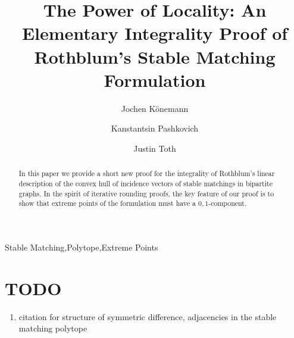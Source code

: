\documentclass[3p,times]{elsarticle}
\begin{document}
\begin{frontmatter}



\title{The Power of Locality: An Elementary Integrality
  Proof of Rothblum's Stable Matching Formulation}
\author[co]{Jochen K\"{o}nemann}
\author[co]{Kanstantsin Pashkovich}
\author[co]{Justin Toth}
\address[co]{Department of Combinatorics and Optimization, University of Waterloo, Canada}


\begin{abstract}
  In this paper we provide a short new proof for the integrality of
  Rothblum's linear description of the convex hull of incidence
  vectors of stable matchings in bipartite graphs. In the spirit of
  iterative rounding proofs, the key feature of our proof is to show
  that extreme points of the formulation must have a $0,1$-component. 
\end{abstract}
\begin{keyword}
Stable Matching\sep Polytope\sep Extreme Points
\end{keyword}
\end{frontmatter}
{\color{red}
\section*{TODO}
\begin{enumerate}
	\item citation for structure of symmetric difference, adjacencies in the stable matching polytope
\end{enumerate}
}
\end{document}
